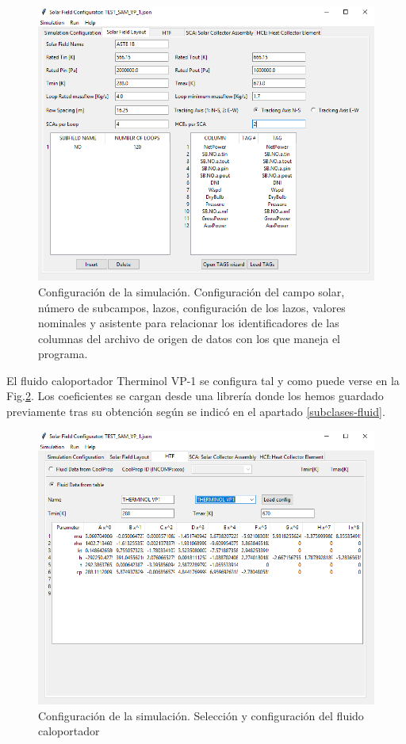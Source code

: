 \begin{figure}
\includegraphics[width=0.9\linewidth]{images/interface02.png}
\caption{Configuración de la simulación. Configuración del campo solar, número de subcampos, lazos, configuración de los lazos, valores nominales y asistente para relacionar los identificadores de las columnas del archivo de origen de datos con los que maneja el programa.} 
\label{fig:interface02}
\end{figure}

El fluido caloportador Therminol VP-1 se configura tal y como puede verse en la Fig.\ref{fig:interface03}. Los coeficientes se cargan desde una librería donde los hemos guardado previamente tras su obtención según se indicó en el apartado \ref{subclases-fluid}.

\begin{figure}
\includegraphics[width=0.9\linewidth]{images/interface03.png}
\caption{Configuración de la simulación. Selección y configuración del fluido caloportador} 
\label{fig:interface03}
\end{figure}

